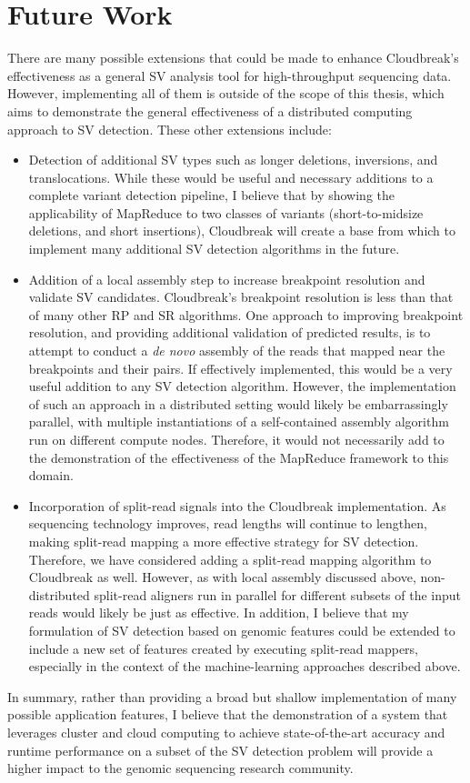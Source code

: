 \chapter{Future Work}
\label{chap_future_work}

There are many possible extensions that could be made to enhance Cloudbreak's effectiveness as a general SV analysis tool for high-throughput sequencing data. However, implementing all of them is outside of the scope of this thesis, which aims to demonstrate the general effectiveness of a distributed computing approach to SV detection. These other extensions include:

\begin{itemize}
 \item Detection of additional SV types such as longer deletions, inversions, and translocations. While these would be useful and necessary additions to a complete variant detection pipeline, I believe that by showing the applicability of MapReduce to two classes of variants (short-to-midsize deletions, and short insertions), Cloudbreak will create a base from which to implement many additional SV detection algorithms in the future.
 \item Addition of a local assembly step to increase breakpoint resolution and validate SV candidates. Cloudbreak's breakpoint resolution is less than that of many other RP and SR algorithms. One approach to improving breakpoint resolution, and providing additional validation of predicted results, is to attempt to conduct a \emph{de novo} assembly of the reads that mapped near the breakpoints and their pairs. If effectively implemented, this would be a very useful addition to any SV detection algorithm. However, the implementation of such an approach in a distributed setting would likely be embarrassingly parallel, with multiple instantiations of a self-contained assembly algorithm run on different compute nodes. Therefore, it would not necessarily add to the demonstration of the effectiveness of the MapReduce framework to this domain.
 \item Incorporation of split-read signals into the Cloudbreak implementation. As sequencing technology improves, read lengths will continue to lengthen, making split-read mapping a more effective strategy for SV detection. Therefore, we have considered adding a split-read mapping algorithm to Cloudbreak as well. However, as with local assembly discussed above, non-distributed split-read aligners run in parallel for different subsets of the input reads would likely be just as effective. In addition, I believe that my formulation of SV detection based on genomic features could be extended to include a new set of features created by executing split-read mappers, especially in the context of the machine-learning approaches described above.
\end{itemize}

In summary, rather than providing a broad but shallow implementation of many possible application features, I believe that the demonstration of a system that leverages cluster and cloud computing to achieve state-of-the-art accuracy and runtime performance on a subset of the SV detection problem will provide a higher impact to the genomic sequencing research community.
